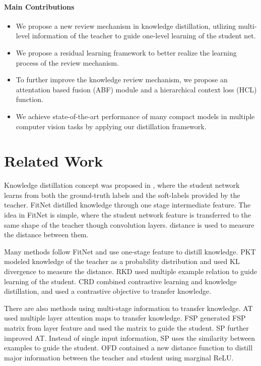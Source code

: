 \documentclass[final]{cvpr}
\begin{document}
\vspace{-0.1in} \paragraph{Main Contributions} 
\begin{itemize}\vspace{-0.05in} 
	\item We propose a new review mechanism in knowledge distillation, utlizing multi-level information of the teacher to guide one-level learning of the student net.\vspace{-0.1in} 
	\item We propose a residual learning framework to better realize the learning process of the review mechanism.\vspace{-0.1in} 
	\item To further improve the knowledge review mechanism, we propose an attentation based fusion (ABF) module and a hierarchical context loss (HCL) function.\vspace{-0.1in} 
	\item We achieve state-of-the-art performance of many compact models in multiple computer vision tasks by applying our distillation framework.
\end{itemize}

\section{Related Work}
Knowledge distillation concept was proposed in \cite{kd}, where the student network learns from both the ground-truth labels and the soft-labels provided by the teacher. 
FitNet \cite{fitnet} distilled knowledge through one stage intermediate feature. The idea in FitNet is simple, where the student network feature is transferred to the same shape of the teacher though convolution layers.  distance is used to measure the distance between them. 

Many methods follow FitNet and use one-stage feature to distill knowledge. 
PKT \cite{pkt} modeled knowledge of the teacher as a probability distribution and used KL divergence to measure the distance. 
RKD \cite{rkd} used multiple example relation to guide learning of the student. 
CRD\cite{crd} combined contrastive learning and knowledge distillation, and used a contrastive objective to transfer knowledge.

There are also methods using multi-stage information to transfer knowledge. 
AT \cite{at} used multiple layer attention maps to transfer knowledge. 
FSP \cite{fsp} generated FSP matrix from layer feature and used the matrix to guide the student. 
SP \cite{spkd} further improved AT. Instead of single input information, SP uses the similarity between examples to guide the student. 
OFD \cite{ofd} contained a new distance function to distill major information between the teacher and student using marginal ReLU. 
\end{document}
